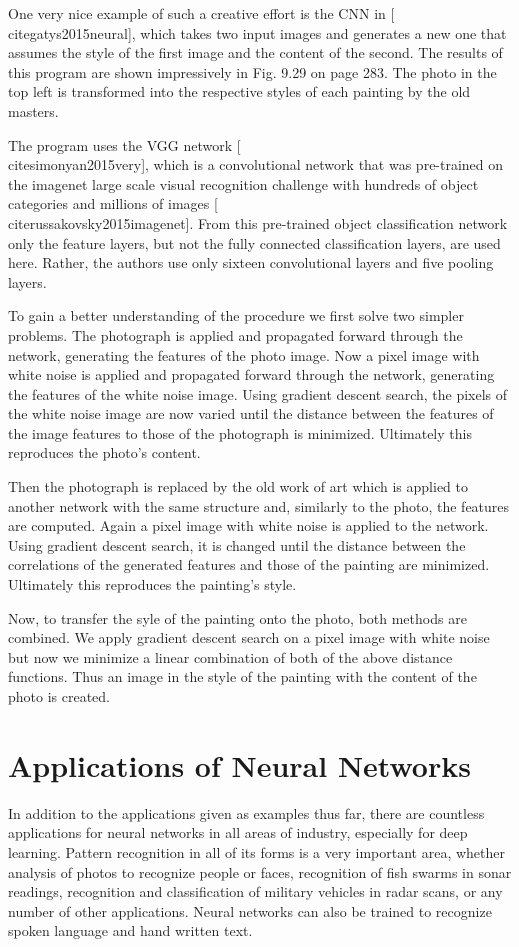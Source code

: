 \documentclass[10pt]{book}
\begin{document}
One very nice example of such a creative effort is the CNN in [\\cite{gatys2015neural}], which takes two input images and generates a new one that assumes the style of the first image and the content of the second. The results of this program are shown impressively in Fig. 9.29 on page 283. The photo in the top left is transformed into the respective styles of each painting by the old masters.


The program uses the VGG network [\\cite{simonyan2015very}], which is a convolutional network that was pre-trained on the imagenet large scale visual recognition challenge with hundreds of object categories and millions of images [\\cite{russakovsky2015imagenet}]. From this pre-trained object classification network only the feature layers, but not the fully connected classification layers, are used here. Rather, the authors use only sixteen convolutional layers and five pooling layers.

To gain a better understanding of the procedure we first solve two simpler problems. The photograph is applied and propagated forward through the network, generating the features of the photo image. Now a pixel image with white noise is applied and propagated forward through the network, generating the features of the white noise image. Using gradient descent search, the pixels of the white noise image are now varied until the distance between the features of the image features to those of the photograph is minimized. Ultimately this reproduces the photo's content.

Then the photograph is replaced by the old work of art which is applied to another network with the same structure and, similarly to the photo, the features are computed. Again a pixel image with white noise is applied to the network. Using gradient descent search, it is changed until the distance between the correlations of the generated features and those of the painting are minimized. Ultimately this reproduces the painting's style.

Now, to transfer the syle of the painting onto the photo, both methods are combined. We apply gradient descent search on a pixel image with white noise but now we minimize a linear combination of both of the above distance functions. Thus an image in the style of the painting with the content of the photo is created.

\section{Applications of Neural Networks}
In addition to the applications given as examples thus far, there are countless applications for neural networks in all areas of industry, especially for deep learning. Pattern recognition in all of its forms is a very important area, whether analysis of photos to recognize people or faces, recognition of fish swarms in sonar readings, recognition and classification of military vehicles in radar scans, or any number of other applications. Neural networks can also be trained to recognize spoken language and hand written text.
\end{document}
